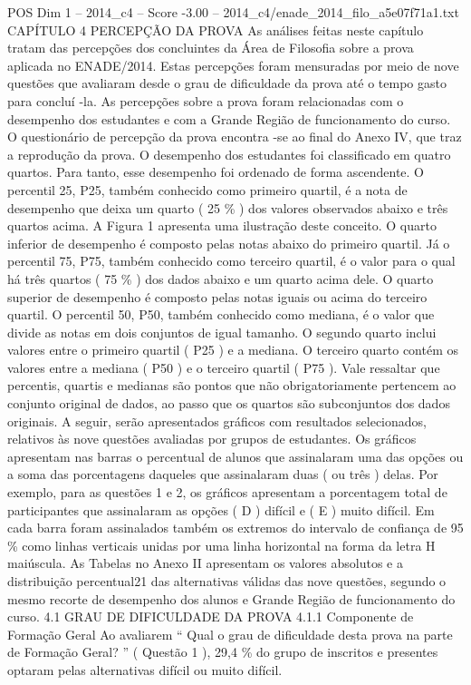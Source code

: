 \begin{textsample}{POS Dim 1 – 2014\_c4 – Score -3.00 – 2014\_c4/enade\_2014\_filo\_a5e07f71a1.txt}  \label{ex:f1_pos_318}
CAPÍTULO 4 PERCEPÇÃO DA PROVA As análises feitas neste capítulo tratam das percepções dos concluintes da Área de Filosofia sobre a prova aplicada no ENADE/2014.
Estas percepções foram mensuradas por meio de nove questões que avaliaram desde o grau de dificuldade da prova até o tempo gasto para concluí -la.
As percepções sobre a prova foram relacionadas com o desempenho dos estudantes e com a Grande Região de funcionamento do curso.
O questionário de percepção da prova encontra -se ao final do Anexo IV, que traz a reprodução da prova.
O desempenho dos estudantes foi classificado em quatro quartos.
Para tanto, esse desempenho foi ordenado de forma ascendente.
O percentil 25, P25, também conhecido como primeiro quartil, é a nota de desempenho que deixa um quarto ( 25 \% ) dos valores observados abaixo e três quartos acima.
A Figura 1 apresenta uma ilustração deste conceito.
O quarto inferior de desempenho é composto pelas notas abaixo do primeiro quartil.
Já o percentil 75, P75, também conhecido como terceiro quartil, é o valor para o qual há três quartos ( 75 \% ) dos dados abaixo e um quarto acima dele.
O quarto superior de desempenho é composto pelas notas iguais ou acima do terceiro quartil.
O percentil 50, P50, também conhecido como mediana, é o valor que divide as notas em dois conjuntos de igual tamanho.
O segundo quarto inclui valores entre o primeiro quartil ( P25 ) e a mediana.
O terceiro quarto contém os valores entre a mediana ( P50 ) e o terceiro quartil ( P75 ).
Vale ressaltar que percentis, quartis e medianas são pontos que não obrigatoriamente pertencem ao conjunto original de dados, ao passo que os quartos são subconjuntos dos dados originais.
A seguir, serão apresentados gráficos com resultados selecionados, relativos às nove questões avaliadas por grupos de estudantes.
Os gráficos apresentam nas barras o percentual de alunos que assinalaram uma das opções ou a soma das porcentagens daqueles que assinalaram duas ( ou três ) delas.
Por exemplo, para as questões 1 e 2, os gráficos apresentam a porcentagem total de participantes que assinalaram as opções ( D ) difícil e ( E ) muito difícil.
Em cada barra foram assinalados também os extremos do intervalo de confiança de 95 \% como linhas verticais unidas por uma linha horizontal na forma da letra H maiúscula.
As Tabelas no Anexo II apresentam os valores absolutos e a distribuição percentual21 das alternativas válidas das nove questões, segundo o mesmo recorte de desempenho dos alunos e Grande Região de funcionamento do curso. 4.1 GRAU DE DIFICULDADE DA PROVA 4.1.1 Componente de Formação Geral Ao avaliarem “ Qual o grau de dificuldade desta prova na parte de Formação Geral? ” ( Questão 1 ), 29,4 \% do grupo de inscritos e presentes optaram pelas alternativas difícil ou muito difícil.

\end{textsample}
